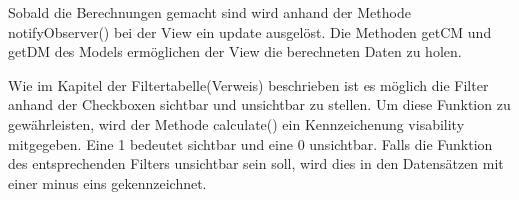Sobald die Berechnungen gemacht sind wird anhand der Methode notifyObserver() bei der View ein update ausgelöst. Die Methoden getCM und getDM des Models ermöglichen der View die berechneten Daten zu holen.

Wie im Kapitel der Filtertabelle(Verweis) beschrieben ist es möglich die Filter anhand der Checkboxen sichtbar und unsichtbar zu stellen. Um diese Funktion zu gewährleisten, wird der Methode calculate() ein Kennzeichenung visability mitgegeben. Eine 1 bedeutet sichtbar und eine 0 unsichtbar. Falls die Funktion des entsprechenden Filters unsichtbar sein soll, wird dies in den Datensätzen mit einer minus eins gekennzeichnet. 

